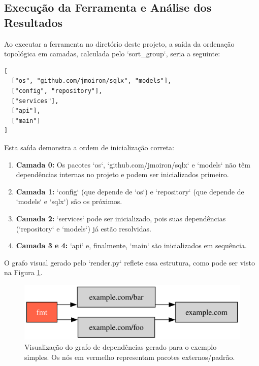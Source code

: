 \documentclass[12pt]{article}
\begin{document}
\subsection{Execução da Ferramenta e Análise dos Resultados}
Ao executar a ferramenta no diretório deste projeto, a saída da ordenação topológica em camadas, calculada pelo `sort\_group`, seria a seguinte:

\begin{verbatim}
[
  ["os", "github.com/jmoiron/sqlx", "models"],
  ["config", "repository"],
  ["services"],
  ["api"],
  ["main"]
]
\end{verbatim}

Esta saída demonstra a ordem de inicialização correta:
\begin{enumerate}
    \item \textbf{Camada 0:} Os pacotes `os`, `github.com/jmoiron/sqlx` e `models` não têm dependências internas no projeto e podem ser inicializados primeiro.
    \item \textbf{Camada 1:} `config` (que depende de `os`) e `repository` (que depende de `models` e `sqlx`) são os próximos.
    \item \textbf{Camada 2:} `services` pode ser inicializado, pois suas dependências (`repository` e `models`) já estão resolvidas.
    \item \textbf{Camada 3 e 4:} `api` e, finalmente, `main` são inicializados em sequência.
\end{enumerate}

O grafo visual gerado pelo `render.py` reflete essa estrutura, como pode ser visto na Figura \ref{fig:grafoExemplo}.

\begin{figure}[ht]
\centering
\includegraphics[width=1\textwidth]{examples/example.com.png}
\caption{Visualização do grafo de dependências gerado para o exemplo simples. Os nós em vermelho representam pacotes externos/padrão.}
\label{fig:grafoExemplo}
\end{figure}
\end{document}
